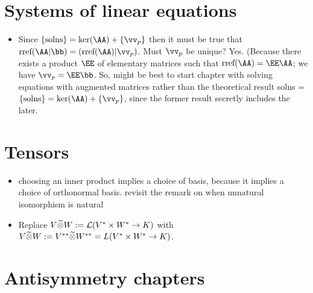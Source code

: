 \section*{Systems of linear equations}

\begin{itemize}
    \item Since $\{\text{solns}\} = \ker(\AA) + \{\vv_p\}$ then it must be true that $\rref(\AA | \bb) = (\rref(\AA) | \vv_p)$. Must $\vv_p$ be unique? Yes. (Because there exists a product $\EE$ of elementary matrices such that $\rref(\AA) = \EE \AA$; we have $\vv_p = \EE \bb$. So, might be best to start chapter with solving equations with augmented matrices rather than the theoretical result solns = $\{\text{solns}\} = \ker(\AA) + \{\vv_p\}$, since the former result secretly includes the later.
\end{itemize}

\section*{Tensors}

\begin{itemize}
    \item choosing an inner product implies a choice of basis, because it implies a choice of orthonormal basis. revisit the remark on when unnatural isomorphism is natural
    \item Replace $V \widetilde{\otimes} W := \mathcal{L}(V^* \times W^* \rightarrow K)$ with $V \widetilde{\otimes} W := V^{**} \widetilde{\otimes} W^{**} = L(V^* \times W^* \rightarrow K)$.
\end{itemize}

\section*{Antisymmetry chapters}

